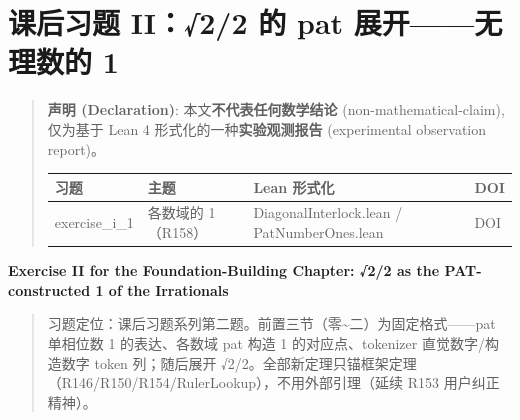 \documentclass[
]{article}
\author{}
\date{}
\newcounter{none} %
\begin{document}
\section{课后习题 II：√2/2 的 pat 展开------无理数的
1}\label{ux7b51ux57faux7bc7ux8bfeux540eux4e60ux9898-ii22-ux7684-pat-ux5c55ux5f00ux65e0ux7406ux6570ux7684-1}

\begin{quote}
\textbf{声明 (Declaration)}: 本文\textbf{不代表任何数学结论}
(non-mathematical-claim), 仅为基于 Lean 4
形式化的一种\textbf{实验观测报告} (experimental observation report)。

{\def\LTcaptype{none} %
\begin{longtable}[]{@{}
 >{\raggedright\arraybackslash}p{}
 >{\raggedright\arraybackslash}p{}
 >{\raggedright\arraybackslash}p{}
 >{\raggedright\arraybackslash}p{}@{}}
\toprule\noalign{}
\begin{minipage}[b]{\linewidth}\raggedright
习题
\end{minipage} & \begin{minipage}[b]{\linewidth}\raggedright
主题
\end{minipage} & \begin{minipage}[b]{\linewidth}\raggedright
Lean 形式化
\end{minipage} & \begin{minipage}[b]{\linewidth}\raggedright
DOI
\end{minipage} \\
\midrule\noalign{}
\endhead
\bottomrule\noalign{}
\endlastfoot
exercise\_i\_1 & 各数域的 1（R158） & DiagonalInterlock.lean /
PatNumberOnes.lean & DOI \\
\end{longtable}
}
\end{quote}

\textbf{Exercise II for the Foundation-Building Chapter: √2/2 as the
PAT-constructed 1 of the Irrationals}

\begin{quote}
习题定位：课后习题系列第二题。前置三节（零\textasciitilde 二）为固定格式------pat
单相位数 1 的表达、各数域 pat 构造 1 的对应点、tokenizer
直觉数字/构造数字 token 列；随后展开
√2/2。全部新定理只锚框架定理（R146/R150/R154/RulerLookup），不用外部引理（延续
R153 用户纠正精神）。
\end{quote}
\end{document}

